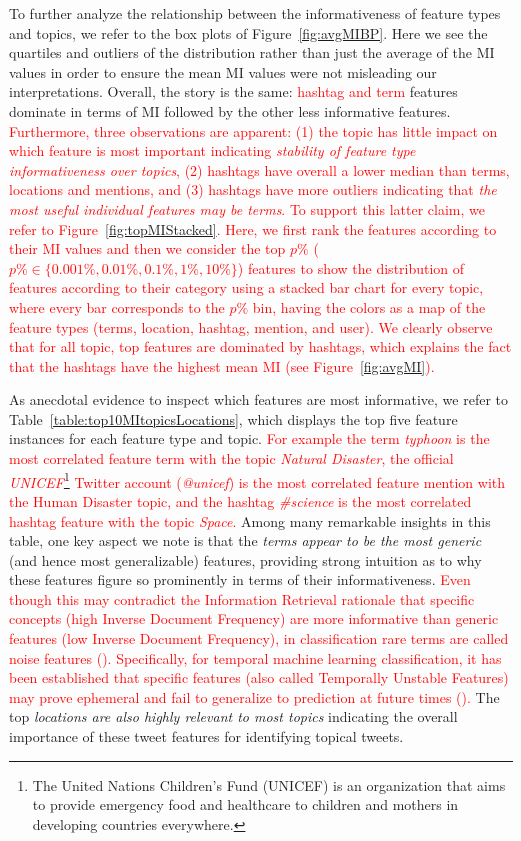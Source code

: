 To further analyze the relationship between the informativeness of feature types and topics,
we refer to the box plots of Figure~\ref{fig:avgMIBP}.  Here we see the quartiles and outliers of
the distribution rather than just the average of the MI values in order to ensure the mean MI
values were not misleading our interpretations.  Overall, the story is the same: \textcolor{red}{ hashtag
and term} features dominate in terms of MI followed by the other less informative
features.  \textcolor{red}{Furthermore, three observations are apparent: (1) the topic has little impact on which feature
is most important indicating \emph{stability of feature type informativeness over topics}, (2) hashtags have overall a lower median than terms, locations and mentions, and (3)  hashtags have more outliers indicating that
\emph{the most useful individual features may be terms}. To support this latter claim, we refer to Figure~\ref{fig:topMIStacked}.
Here, we first rank the features according to their MI values and then we consider the top $p\%$ ( $p\% \in \{0.001\%, 0.01\%, 0.1\%, 1\%, 10\%\}$) features to show the distribution of features according to their category using a stacked bar chart for every topic, where every bar corresponds to the $p\%$ bin, having the colors as a map of the feature types (terms, location, hashtag, mention, and user). We clearly observe that for all topic, top features are dominated by hashtags, which explains the fact that the hashtags have the highest mean MI (see Figure~\ref{fig:avgMI}).
}




As anecdotal evidence to inspect which features are most informative, we refer to
Table~\ref{table:top10MItopicsLocations}, which displays the top five feature instances
for each feature type and topic. \textcolor{red}{For example the term \textit{typhoon} is the most correlated feature term with the topic \textit{Natural Disaster}, the official \textit{UNICEF}\footnote{The United Nations Children's Fund (UNICEF) is an organization that aims to provide emergency food and healthcare to children and mothers in developing countries everywhere.} Twitter account (\textit{@unicef}) is the most correlated feature mention with the Human Disaster topic, and the hashtag \textit{\#science} is the most correlated hashtag feature with the topic \textit{Space}.}
Among many remarkable insights in this table, one key aspect we note is that the \emph{terms appear to be the most generic} (and hence most generalizable) features, providing strong intuition as to why these features figure so prominently in terms of their informativeness. \textcolor{red}{
Even though this may contradict the Information Retrieval rationale that specific concepts (high Inverse Document Frequency) are more informative than generic features (low Inverse Document Frequency), in classification rare terms are called noise features (\cite{manning_ir}). 
Specifically,  for temporal machine learning classification, it has been established that specific features (also called Temporally Unstable Features) may prove ephemeral and fail to generalize to prediction at future times (\cite{Wang2019}). }
The top \emph{locations are also highly relevant to most topics} indicating the overall importance of these tweet features for identifying topical tweets.

